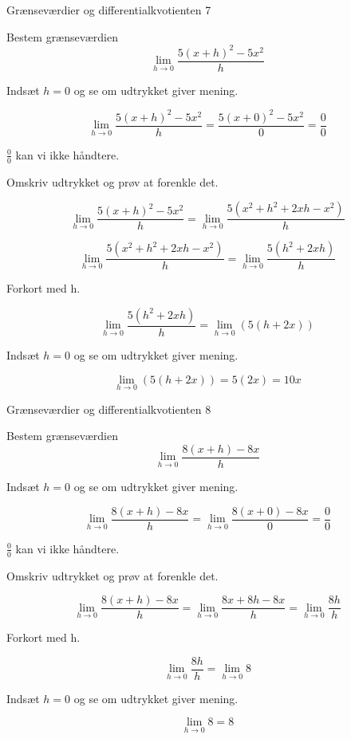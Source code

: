 \documentclass{article}
\begin{document}
\newpage
\begin{exercise}{Grænseværdier og differentialkvotienten 7}

Bestem grænseværdien
\[
\lim_{h \to 0} \frac{5(x + h)^2 - 5x^2}{h}
\]


\hint
Indsæt $h=0$ og se om udtrykket giver mening.

\hint
\[
\lim_{h \to 0} \frac{5(x + h)^2 - 5x^2}{h} = \frac{5(x + 0)^2 - 5x^2}{0} = \frac{0}{0}
\]

\hint
$\frac{0}{0}$ kan vi ikke håndtere.

\hint
Omskriv udtrykket og prøv at forenkle det.

\hint
\[
\lim_{h \to 0} \frac{5(x + h)^2 - 5x^2}{h} = \lim_{h \to 0} \frac{5\left(x^2 + h^2 + 2xh - x^2\right)}{h}
\]

\hint
\[
\lim_{h \to 0} \frac{5\left(x^2 + h^2 + 2xh - x^2\right)}{h} = \lim_{h \to 0} \frac{5\left(h^2 + 2xh\right)}{h}
\]

\hint
Forkort med h.

\hint
\[
\lim_{h \to 0} \frac{5\left(h^2 + 2xh\right)}{h} = \lim_{h \to 0} \left(5(h + 2x)\right)
\]

\hint
Indsæt $h=0$ og se om udtrykket giver mening.

\hint
\[
\lim_{h \to 0} \left(5(h + 2x)\right) = 5(2x) = 10x
\]

\end{exercise}

\newpage
\begin{exercise}{Grænseværdier og differentialkvotienten 8}

Bestem grænseværdien
\[
\lim_{h \to 0} \frac{8(x + h)-8x}{h}
\]


\hint
Indsæt $h=0$ og se om udtrykket giver mening.

\hint
\[
\lim_{h \to 0} \frac{8(x + h)-8x}{h} =\lim_{h \to 0} \frac{8(x + 0)-8x}{0} = \frac{0}{0}
\]

\hint
$\frac{0}{0}$ kan vi ikke håndtere.

\hint
Omskriv udtrykket og prøv at forenkle det.

\hint
\[
\lim_{h \to 0} \frac{8(x + h)-8x}{h} = \lim_{h \to 0} \frac{8x + 8h - 8x}{h} = \lim_{h \to 0} \frac{8h}{h}
\]

\hint
Forkort med h.

\hint
\[
\lim_{h \to 0} \frac{8h}{h} = \lim_{h \to 0} 8
\]

\hint
Indsæt $h=0$ og se om udtrykket giver mening.

\hint
\[
\lim_{h \to 0} 8 = 8
\]

\end{exercise}


\newpage
\end{document}
